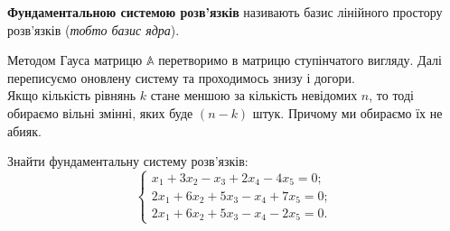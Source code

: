 \documentclass{math_library}
\begin{document}
\begin{definition}
\textbf{Фундаментальною системою розв'язків} називають базис лінійного простору розв'язків (\textit{тобто базис ядра}).
\end{definition}
\noindent
Методом Гауса матрицю $\mathbb{A}$ перетворимо в матрицю ступінчатого вигляду. Далі переписуємо оновлену систему та проходимось знизу і догори.\\
Якщо кількість рівнянь $k$ стане меншою за кількість невідомих $n$, то тоді обираємо вільні змінні, яких буде $(n-k)$ штук. Причому ми обираємо їх не абияк.
\begin{example}
Знайти фундаментальну систему розв'язків: 
\[
\begin{cases}
x_1 + 3x_2 - x_3 + 2x_4 - 4x_5 = 0; \\
2x_1 + 6x_2 + 5x_3 - x_4 + 7x_5 = 0; \\
2x_1 + 6x_2 + 5x_3 - x_4 - 2x_5 = 0.
\end{cases}
\]


\end{example}
\end{document}
